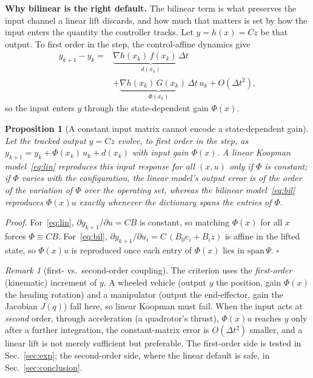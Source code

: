 \documentclass[lettersize,journal]{IEEEtran}
\newtheorem{proposition}{Proposition}
\theoremstyle{remark}
\newtheorem{remark}{Remark}
\begin{document}
\textbf{Why bilinear is the right default.}
The bilinear term is what preserves the input channel a linear lift discards, and how much that matters is set by how the input enters the quantity the controller tracks.
Let $y=h(x)=Cz$ be that output.
To first order in the step, the control-affine dynamics give
\begin{equation}\label{eq:firstorder}
\begin{aligned}
y_{k+1}-y_k = {}&\underbrace{\nabla h(x_k)\,f(x_k)\,\Delta t}_{d(x_k)}\\[2pt]
&+ \underbrace{\nabla h(x_k)\,G(x_k)\,\Delta t}_{\Phi(x_k)}\,u_k + O(\Delta t^2),
\end{aligned}
\end{equation}
so the input enters $y$ through the state-dependent gain $\Phi(x)$.

\begin{proposition}[A constant input matrix cannot encode a state-dependent gain]\label{prop:crit}
Let the tracked output $y=Cz$ evolve, to first order in the step, as $y_{k+1}=y_k+\Phi(x_k)\,u_k+d(x_k)$ with input gain $\Phi(x)$.
A linear Koopman model~\eqref{eq:lin} reproduces this input response for all $(x,u)$ only if $\Phi$ is constant; if $\Phi$ varies with the configuration, the linear model's output error is of the order of the variation of $\Phi$ over the operating set, whereas the bilinear model~\eqref{eq:bil} reproduces $\Phi(x)u$ exactly whenever the dictionary spans the entries of $\Phi$.
\end{proposition}
\noindent\emph{Proof.}
For~\eqref{eq:lin}, $\partial y_{k+1}/\partial u = CB$ is constant, so matching $\Phi(x)$ for all $x$ forces $\Phi\equiv CB$.
For~\eqref{eq:bil}, $\partial y_{k+1}/\partial u_i = C\,(B_0 e_i + B_i z)$ is affine in the lifted state, so $\Phi(x)u$ is reproduced once each entry of $\Phi(x)$ lies in $\mathrm{span}\,\Psi$. \hfill$\square$

\begin{remark}[first- vs.\ second-order coupling]\label{rem:order}
The criterion uses the \emph{first-order} (kinematic) increment of $y$.
A wheeled vehicle (output $y$ the position, gain $\Phi(x)$ the heading rotation) and a manipulator (output the end-effector, gain the Jacobian $J(q)$) fall here, so linear Koopman must fail.
When the input acts at \emph{second} order, through acceleration (a quadrotor's thrust), $\Phi(x)u$ reaches $y$ only after a further integration, the constant-matrix error is $O(\Delta t^2)$ smaller, and a linear lift is not merely sufficient but preferable.
The first-order side is tested in Sec.~\ref{sec:exp}; the second-order side, where the linear default is safe, in Sec.~\ref{sec:conclusion}.
\end{remark}
\end{document}
